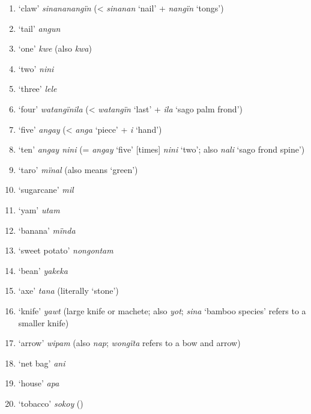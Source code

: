 \begin{enumerate}[noitemsep, label={\arabic*}, align=left, widest=190, labelsep=1ex,leftmargin=*]
\item  ‘claw’ \textit{sinananangïn} (< \textit{sinanan} ‘nail’ + \textit{nangïn} ‘tongs’)

\item  ‘tail’ \textit{angun}

\item  ‘one’ \textit{kwe} (also \textit{kwa})

\item  ‘two’ \textit{nini}

\item  ‘three’ \textit{lele}

\item  ‘four’ \textit{watangïnila} (< \textit{watangïn} ‘last’ + \textit{ila} ‘sago palm frond’)

\item  ‘five’ \textit{angay} (< \textit{anga} ‘piece’ + \textit{i} ‘hand’)

\item  ‘ten’ \textit{angay nini} (= \textit{angay} ‘five’ [times] \textit{nini} ‘two’; also \textit{nali} ‘sago frond spine’)

\item  ‘taro’ \textit{mïnal} (also means ‘green’)

\item  ‘sugarcane’ \textit{mil}

\item  ‘yam’ \textit{utam}

\item  ‘banana’ \textit{mïnda}

\item  ‘sweet potato’ \textit{nongontam}

\item  ‘bean’ \textit{yakeka}

\item  ‘axe’ \textit{tana} (literally ‘stone’)

\item  ‘knife’ \textit{yawt} (large knife or machete; also \textit{yot}; \textit{sina} ‘bamboo species’ refers to a smaller knife)

\item  ‘arrow’ \textit{wipam} (also \textit{nap}; \textit{wongïta} refers to a bow and arrow)

\item  ‘net bag’ \textit{ani}

\item  ‘house’ \textit{apa}

\item  ‘tobacco’ \textit{sokoy} ()


\end{enumerate}

